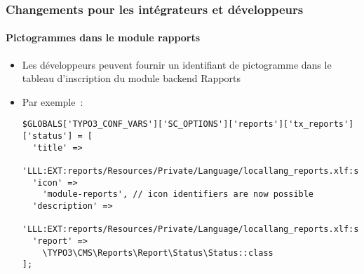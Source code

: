 %

\begin{frame}[fragile]
	\frametitle{Changements pour les intégrateurs et développeurs}
	\framesubtitle{Pictogrammes dans le module rapports}


	\begin{itemize}
		\item Les développeurs peuvent fournir un identifiant de pictogramme dans le tableau
			d'inscription du module backend Rapports
		\item Par exemple~:
\begin{lstlisting}
$GLOBALS['TYPO3_CONF_VARS']['SC_OPTIONS']['reports']['tx_reports']['status'] = [
  'title' =>
    'LLL:EXT:reports/Resources/Private/Language/locallang_reports.xlf:status_report_title',
  'icon' =>
    'module-reports', // icon identifiers are now possible
  'description' =>
    'LLL:EXT:reports/Resources/Private/Language/locallang_reports.xlf:status_report_description',
  'report' =>
    \TYPO3\CMS\Reports\Report\Status\Status::class
];
\end{lstlisting}

	\end{itemize}

\end{frame}

